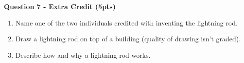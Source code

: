 \documentclass[14pt]{report}
\begin{document}
\textbf{Question 7 - Extra Credit (5pts)}
\begin{enumerate}[label=\Alph*]
\item Name one of the two individuals credited with inventing the lightning rod.
\item Draw a lightning rod on top of a building (quality of drawing isn't graded).
\item Describe how and why a lightning rod works.
\end{enumerate}
 
\end{document}
